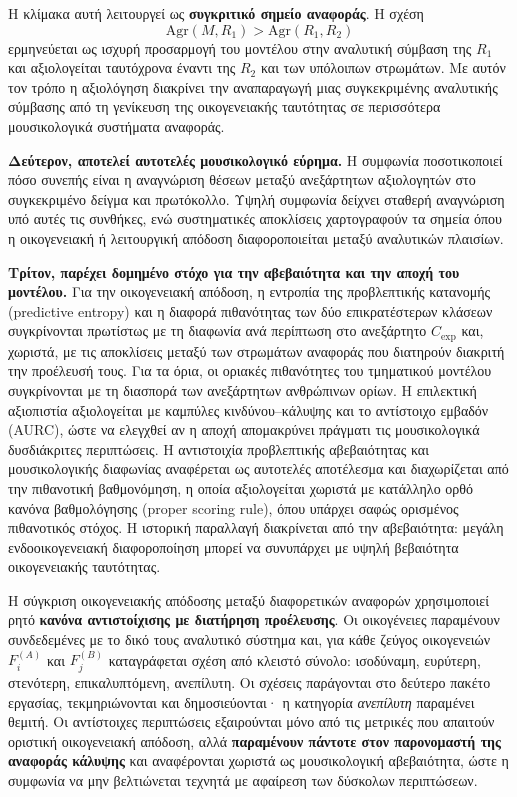 \documentclass[11pt,a4paper]{article}
\begin{document}
Η κλίμακα αυτή λειτουργεί ως \textbf{συγκριτικό σημείο αναφοράς}. Η σχέση
\[
\mathrm{Agr}(M,R_1)>\mathrm{Agr}(R_1,R_2)
\]
ερμηνεύεται ως ισχυρή προσαρμογή του μοντέλου στην αναλυτική σύμβαση της \(R_1\) και αξιολογείται ταυτόχρονα έναντι της \(R_2\) και των υπόλοιπων στρωμάτων. Με αυτόν τον τρόπο η αξιολόγηση διακρίνει την αναπαραγωγή μιας συγκεκριμένης αναλυτικής σύμβασης από τη γενίκευση της οικογενειακής ταυτότητας σε περισσότερα μουσικολογικά συστήματα αναφοράς.

\textbf{Δεύτερον, αποτελεί αυτοτελές μουσικολογικό εύρημα.} Η συμφωνία ποσοτικοποιεί πόσο συνεπής είναι η αναγνώριση θέσεων μεταξύ ανεξάρτητων αξιολογητών στο συγκεκριμένο δείγμα και πρωτόκολλο. Υψηλή συμφωνία δείχνει σταθερή αναγνώριση υπό αυτές τις συνθήκες, ενώ συστηματικές αποκλίσεις χαρτογραφούν τα σημεία όπου η οικογενειακή ή λειτουργική απόδοση διαφοροποιείται μεταξύ αναλυτικών πλαισίων.

\textbf{Τρίτον, παρέχει δομημένο στόχο για την αβεβαιότητα και την αποχή του μοντέλου.} Για την οικογενειακή απόδοση, η εντροπία της προβλεπτικής κατανομής (predictive entropy) και η διαφορά πιθανότητας των δύο επικρατέστερων κλάσεων συγκρίνονται πρωτίστως με τη διαφωνία ανά περίπτωση στο ανεξάρτητο $C_{\mathrm{exp}}$ και, χωριστά, με τις αποκλίσεις μεταξύ των στρωμάτων αναφοράς που διατηρούν διακριτή την προέλευσή τους. Για τα όρια, οι οριακές πιθανότητες του τμηματικού μοντέλου συγκρίνονται με τη διασπορά των ανεξάρτητων ανθρώπινων ορίων. Η επιλεκτική αξιοπιστία αξιολογείται με καμπύλες κινδύνου--κάλυψης και το αντίστοιχο εμβαδόν (AURC), ώστε να ελεγχθεί αν η αποχή απομακρύνει πράγματι τις μουσικολογικά δυσδιάκριτες περιπτώσεις. Η αντιστοιχία προβλεπτικής αβεβαιότητας και μουσικολογικής διαφωνίας αναφέρεται ως αυτοτελές αποτέλεσμα και διαχωρίζεται από την πιθανοτική βαθμονόμηση, η οποία αξιολογείται χωριστά με κατάλληλο ορθό κανόνα βαθμολόγησης (proper scoring rule), όπου υπάρχει σαφώς ορισμένος πιθανοτικός στόχος. Η ιστορική παραλλαγή διακρίνεται από την αβεβαιότητα: μεγάλη ενδοοικογενειακή διαφοροποίηση μπορεί να συνυπάρχει με υψηλή βεβαιότητα οικογενειακής ταυτότητας.

Η σύγκριση οικογενειακής απόδοσης μεταξύ διαφορετικών αναφορών χρησιμοποιεί ρητό \textbf{κανόνα αντιστοίχισης με διατήρηση προέλευσης}. Οι οικογένειες παραμένουν συνδεδεμένες με το δικό τους αναλυτικό σύστημα και, για κάθε ζεύγος οικογενειών \(F_i^{(A)}\) και \(F_j^{(B)}\) καταγράφεται σχέση από κλειστό σύνολο: ισοδύναμη, ευρύτερη, στενότερη, επικαλυπτόμενη, ανεπίλυτη. Οι σχέσεις παράγονται στο δεύτερο πακέτο εργασίας, τεκμηριώνονται και δημοσιεύονται· η κατηγορία \emph{ανεπίλυτη} παραμένει θεμιτή. Οι αντίστοιχες περιπτώσεις εξαιρούνται μόνο από τις μετρικές που απαιτούν οριστική οικογενειακή απόδοση, αλλά \textbf{παραμένουν πάντοτε στον παρονομαστή της αναφοράς κάλυψης} και αναφέρονται χωριστά ως μουσικολογική αβεβαιότητα, ώστε η συμφωνία να μην βελτιώνεται τεχνητά με αφαίρεση των δύσκολων περιπτώσεων.
\end{document}
